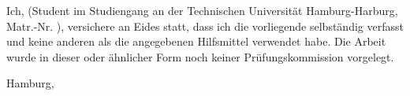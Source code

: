 \makeatletter

\noindent Ich, {\scshape\tuhhpreamble@author} (Student im Studiengang \tuhhthesis@course{} an der Technischen Universit{\"a}t Hamburg-Harburg, Matr.-Nr. \tuhhthesis@matrnumber), versichere an Eides statt, dass ich die vorliegende {\tuhhpreamble@subject} selbst{\"a}ndig verfasst und keine anderen als die angegebenen Hilfsmittel verwendet habe. Die Arbeit wurde in dieser oder {\"a}hnlicher Form noch keiner Pr{\"u}fungskommission vorgelegt.\\

\vspace{2.0cm}

\noindent Hamburg, \printdate

\vspace{1.0cm}
\hfill \tuhhpreamble@author \hspace{2.0cm}

\makeatother


